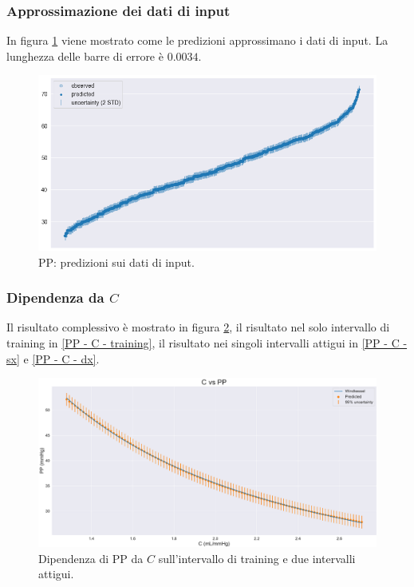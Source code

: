 \vspace{-0.5cm}

\subsubsection{Approssimazione dei dati di input}
In figura \ref{PP - inference} viene mostrato come le predizioni approssimano i dati di input. La lunghezza delle barre di errore è $0.0034$.

\begin{figure}[h]
    \centering
    \includegraphics[width=1\textwidth]{images/Training (risultati)/PP/PP - inference.png}
    \caption{PP: predizioni sui dati di input.}
    \label{PP - inference}
\end{figure}



\subsubsection{Dipendenza da $C$}
Il risultato complessivo è mostrato in figura \ref{PP - C - full}, il risultato nel solo intervallo di training in \ref{PP - C - training}, il risultato nei singoli intervalli attigui in \ref{PP - C - sx} e \ref{PP - C - dx}.

\vspace{1cm}

\begin{figure}[!htb]
    \centering
    \includegraphics[width=1\textwidth]{images/Training (risultati)/PP/PP - C - full.pdf}
    \caption{Dipendenza di PP da $C$ sull'intervallo di training e due intervalli attigui.}
    \label{PP - C - full}
\end{figure}

